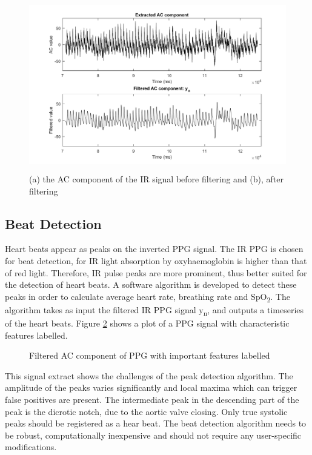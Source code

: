 \begin{figure}[H]
   \centering
   \includegraphics[width=12cm,height=7.5cm]{figs/PPG_Filter.png}
   \caption{(a) the AC component of the IR signal before filtering and (b), after filtering}
   \label{fig:PPG_Filter}
\end{figure}

\subsection{Beat Detection}
Heart beats appear as peaks on the inverted PPG signal. The IR PPG is chosen for beat detection, for IR light absorption by oxyhaemoglobin is higher than that of red light. Therefore, IR pulse peaks are more prominent, thus better suited for the detection of heart beats. A software algorithm is developed to detect these peaks in order to calculate average heart rate, breathing rate and SpO\textsubscript{2}. The algorithm takes as input the filtered IR PPG signal y\textsubscript{n}, and outputs a timeseries of the heart beats. Figure \ref{fig:PPG_SignalLabels} shows a plot of a PPG signal with characteristic features labelled.

\begin{figure}[H]
\centering
\graphicspath{{figs/}}

\caption{Filtered AC component of PPG with important features labelled}
\label{fig:PPG_SignalLabels}
\end{figure}

This signal extract shows the challenges of the peak detection algorithm. The amplitude of the peaks varies significantly and local maxima which can trigger false positives are present. The intermediate peak in the descending part of the peak is the dicrotic notch, due to the aortic valve closing. Only true systolic peaks should be registered as a hear beat. The beat detection algorithm needs to be robust, computationally inexpensive and should not require any user-specific modifications. 

